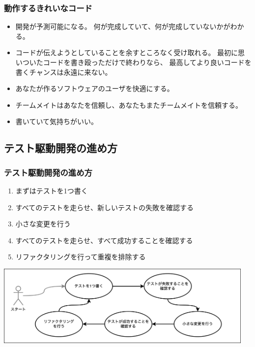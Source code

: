 \documentclass[aspectratio=169]{beamer}
\begin{document}
\begin{frame}[fragile]\frametitle{動作するきれいなコード}
  \begin{itemize}
    \item {\color{blue} 開発が予測可能になる。}
      何が完成していて、何が完成していないかがわかる。
    \item {\color{blue} コードが伝えようとしていることを余すところなく受け取れる。}
      最初に思いついたコードを書き殴っただけで終わりなら、
      最高してより良いコードを書くチャンスは永遠に来ない。

    \large \color{blue}
    \item あなたが作るソフトウェアのユーザを快適にする。
    \item チームメイトはあなたを信頼し、あなたもまたチームメイトを信頼する。
    \item 書いていて気持ちがいい。
  \end{itemize}
\end{frame}

\subsection{テスト駆動開発の進め方}
\begin{frame}\frametitle{テスト駆動開発の進め方}
  \begin{enumerate}
    \item まずはテストを1つ書く
    \item すべてのテストを走らせ、新しいテストの失敗を確認する
    \item 小さな変更を行う
    \item すべてのテストを走らせ、すべて成功することを確認する
    \item リファクタリングを行って重複を排除する
  \end{enumerate}

  \begin{center}
    \includegraphics[height=4cm]{asset/tdd_cycle.png}
  \end{center}
\end{frame}
\end{document}
